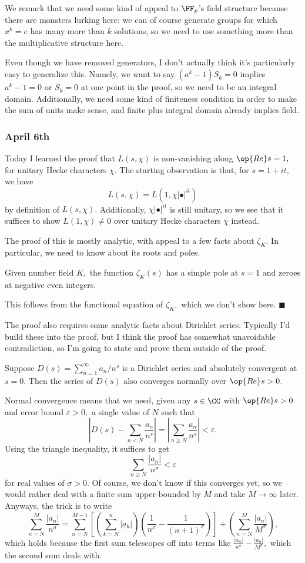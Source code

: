 We remark that we need some kind of appeal to $\FF_p$'s field structure because there are monsters lurking here: we can of course generate groups for which $x^k=e$ has many more than $k$ solutions, so we need to use something more than the multiplicative structure here.

Even though we have removed generators, I don't actually think it's particularly easy to generalize this. Namely, we want to say $\left(a^k-1\right)S_k=0$ implies $a^k-1=0$ or $S_k=0$ at one point in the proof, so we need to be an integral domain. Additionally, we need some kind of finiteness condition in order to make the sum of units make sense, and finite plus integral domain already implies field.

\subsubsection{April 6th}
Today I learned the proof that $L(s,\chi)$ is non-vanishing along $\op{Re}s=1,$ for unitary Hecke characters $\chi.$ The starting observation is that, for $s=1+it,$ we have
\[L(s,\chi)=L\left(1,\chi|\bullet|^{it}\right)\]
by definition of $L(s,\chi).$ Additionally, $\chi|\bullet|^{it}$ is still unitary, so we see that it suffices to show $L(1,\chi)\ne0$ over unitary Hecke characters $\chi$ instead.

The proof of this is mostly analytic, with appeal to a few facts about $\zeta_K.$ In particular, we need to know about its roots and poles.
\begin{lemma}
    Given number field $K,$ the function $\zeta_K(s)$ has a simple pole at $s=1$ and zeroes at negative even integers.
\end{lemma}
This follows from the functional equation of $\zeta_K,$ which we don't show here. $\blacksquare$

The proof also requires some analytic facts about Dirichlet series. Typically I'd build these into the proof, but I think the proof has somewhat unavoidable contradiction, so I'm going to state and prove them outside of the proof.
\begin{lemma}
    Suppose $D(s)=\sum_{n=1}^\infty a_n/n^s$ is a Dirichlet series and absolutely convergent at $s=0.$ Then the series of $D(s)$ also converges normally over $\op{Re}s>0.$
\end{lemma}
Normal convergence means that we need, given any $s\in\CC$ with $\op{Re}s>0$ and error bound $\varepsilon>0,$ a single value of $N$ such that
\[\left|D(s)-\sum_{n<N}\frac{a_n}{n^s}\right|=\left|\sum_{n\ge N}\frac{a_n}{n^s}\right|<\varepsilon.\]
Using the triangle inequality, it suffices to get
\[\sum_{n\ge N}\frac{|a_n|}{n^\sigma}<\varepsilon\]
for real values of $\sigma>0.$ Of course, we don't know if this converges yet, so we would rather deal with a finite sum upper-bounded by $M$ and take $M\to\infty$ later. Anyways, the trick is to write
\[\sum_{n=N}^M\frac{|a_n|}{n^\sigma}=\sum_{n=N}^{M-1}\left[\left(\sum_{k=N}^n|a_k|\right)\left(\frac1{n^\sigma}-\frac1{(n+1)^\sigma}\right)\right]+\left(\sum_{n=N}^M\frac{|a_n|}{M^\sigma}\right),\]
which holds because the first sum telescopes off into terms like $\frac{|a_n|}{n^\sigma}-\frac{|a_n|}{M^\sigma},$ which the second sum deals with.

